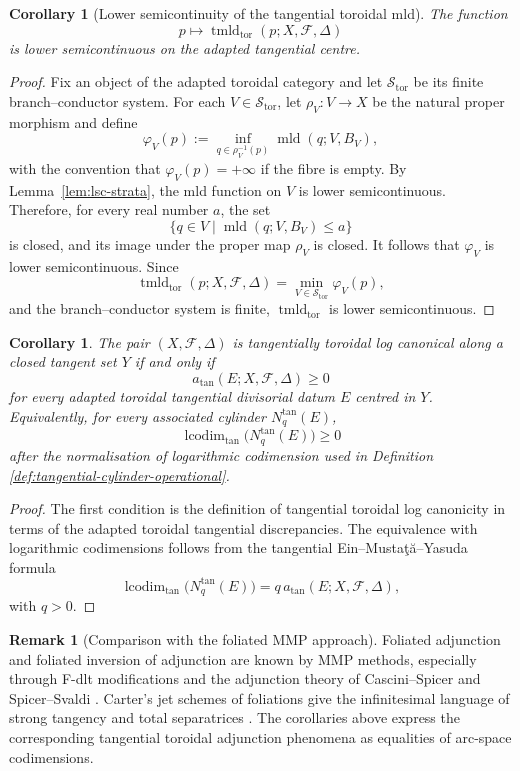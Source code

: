 \documentclass[11pt]{amsart}
\numberwithin{equation}{section}
\theoremstyle{plain}
\newtheorem{Corollary}[Theorem]{Corollary}
\theoremstyle{definition}
\newtheorem{Remark}[Theorem]{Remark}
\newcommand{\mld}{\operatorname{mld}}
\newcommand{\tmldtor}{\operatorname{tmld}_{\mathrm{tor}}}
\newcommand{\lcodim}{\operatorname{lcodim}}
\newcommand{\cF}{\mathcal F}
\begin{document}
\begin{Corollary}[Lower semicontinuity of the tangential toroidal mld]
\label{cor:lsc}
The function
\[
p\longmapsto \tmldtor(p;X,\cF,\Delta)
\]
is lower semicontinuous on the adapted tangential centre.
\end{Corollary}

\begin{proof}
Fix an object of the adapted toroidal category and let
\(\mathscr S_{\mathrm{tor}}\) be its finite branch--conductor system.  For each
\(V\in\mathscr S_{\mathrm{tor}}\), let \(\rho_V:V\to X\) be the natural proper
morphism and define
\[
\varphi_V(p):=
\inf_{q\in \rho_V^{-1}(p)}
\mld(q;V,B_V),
\]
with the convention that \(\varphi_V(p)=+\infty\) if the fibre is empty.  By
Lemma~\ref{lem:lsc-strata}, the mld function on \(V\) is lower
semicontinuous.  Therefore, for every real number \(a\), the set
\[
\{q\in V\mid \mld(q;V,B_V)\le a\}
\]
is closed, and its image under the proper map \(\rho_V\) is closed.  It
follows that \(\varphi_V\) is lower semicontinuous.  Since
\[
\tmldtor(p;X,\cF,\Delta)
=
\min_{V\in\mathscr S_{\mathrm{tor}}}\varphi_V(p),
\]
and the branch--conductor system is finite, \(\tmldtor\) is lower
semicontinuous.
\end{proof}

\begin{Corollary} 
\label{cor:cylinder-criterion}
The pair \((X,\cF,\Delta)\) is tangentially toroidal log canonical along a
closed tangent set \(Y\) if and only if
\[
a_{\tan}(E;X,\cF,\Delta)\ge 0
\]
for every adapted toroidal tangential divisorial datum \(E\) centred in \(Y\).
Equivalently, for every associated cylinder \(N_q^{\tan}(E)\),
\[
\lcodim_{\tan}\bigl(N_q^{\tan}(E)\bigr)\ge 0
\]
after the normalisation of logarithmic codimension used in Definition
\ref{def:tangential-cylinder-operational}.
\end{Corollary}

\begin{proof}
The first condition is the definition of tangential toroidal log canonicity in
terms of the adapted toroidal tangential discrepancies.  The equivalence with
logarithmic codimensions follows from the tangential
Ein--Musta\c{t}\u{a}--Yasuda formula
\[
\lcodim_{\tan}\bigl(N_q^{\tan}(E)\bigr)
= q\,a_{\tan}(E;X,\cF,\Delta),
\]
with \(q>0\).
\end{proof}

\begin{Remark}[Comparison with the foliated MMP approach]
Foliated adjunction and foliated inversion of adjunction are known by MMP
methods, especially through F-dlt modifications and the adjunction theory of
Cascini--Spicer and Spicer--Svaldi \cite{CSMMP,SS,CSAdj}.  Carter's jet
schemes of foliations give the infinitesimal language of strong tangency and
total separatrices \cite{Carter,CarterThesis}.  The corollaries above express
the corresponding tangential toroidal adjunction phenomena as equalities of
arc-space codimensions.  
\end{Remark}
\end{document}
